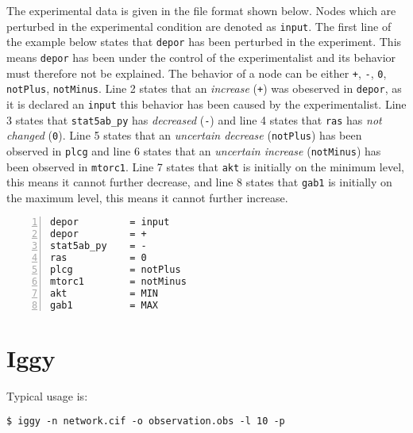 \documentclass{article}
\begin{document}
The experimental data is given in the file format shown below.
Nodes which are perturbed in the experimental condition are denoted as \texttt{input}.
The first line of the example below states that \texttt{depor} has been perturbed in the experiment.
This means \texttt{depor} has been under the control of the experimentalist 
 and its behavior must therefore not be explained.
The behavior of a node can be either \texttt{+}, \texttt{-}, \texttt{0}, \texttt{notPlus}, \texttt{notMinus}.
Line 2 states that an \emph{increase} (\texttt{+}) was obeserved in \texttt{depor},
 as it is declared an \texttt{input} this behavior has been caused by the experimentalist.
Line 3 states that \texttt{stat5ab\_py} has \emph{decreased} (\texttt{-}) and
line 4 states that \texttt{ras} has \emph{not changed} (\texttt{0}).
Line 5 states that an \emph{uncertain decrease} (\texttt{notPlus}) has been observed in \texttt{plcg} and
line 6 states that an \emph{uncertain increase} (\texttt{notMinus}) has been observed in \texttt{mtorc1}.
Line 7 states that \texttt{akt} is initially on the minimum level, this means it cannot further decrease, and
line 8 states that \texttt{gab1} is initially on the maximum level, this means it cannot further increase.

\begin{Verbatim}[frame=single,numbers=left]
depor         = input 
depor         = +
stat5ab_py    = -
ras           = 0
plcg          = notPlus
mtorc1        = notMinus
akt           = MIN
gab1          = MAX
\end{Verbatim}  

\section{Iggy}

Typical usage is:
\begin{Verbatim}[frame=single]
 $ iggy -n network.cif -o observation.obs -l 10 -p
\end{Verbatim}
\end{document}
